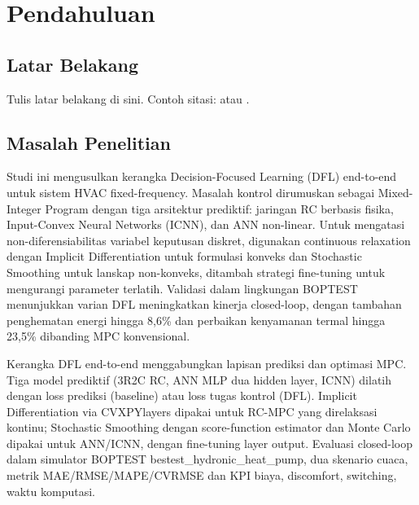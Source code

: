 \chapter{Pendahuluan}
\section{Latar Belakang}
Tulis latar belakang di sini. Contoh sitasi: \textcite{Sheng_2026} atau \parencite{Sheng_2026}.

\section{Masalah Penelitian}
Studi ini mengusulkan kerangka Decision-Focused Learning (DFL) end-to-end untuk sistem HVAC fixed-frequency. 
Masalah kontrol dirumuskan sebagai Mixed-Integer Program dengan tiga arsitektur prediktif: 
jaringan RC berbasis fisika, Input-Convex Neural Networks (ICNN), dan ANN non-linear. 
Untuk mengatasi non-diferensiabilitas variabel keputusan diskret, digunakan continuous relaxation 
dengan Implicit Differentiation untuk formulasi konveks dan Stochastic Smoothing untuk lanskap non-konveks, 
ditambah strategi fine-tuning untuk mengurangi parameter terlatih. Validasi dalam lingkungan BOPTEST 
menunjukkan varian DFL meningkatkan kinerja closed-loop, dengan tambahan penghematan energi hingga 8,6\% 
dan perbaikan kenyamanan termal hingga 23,5\% dibanding MPC konvensional. 

Kerangka DFL end-to-end menggabungkan lapisan prediksi dan optimasi MPC. Tiga model prediktif 
(3R2C RC, ANN MLP dua hidden layer, ICNN) dilatih dengan loss prediksi (baseline) atau loss tugas kontrol 
(DFL). Implicit Differentiation via CVXPYlayers dipakai untuk RC-MPC yang direlaksasi kontinu; Stochastic 
Smoothing dengan score-function estimator dan Monte Carlo dipakai untuk ANN/ICNN, dengan fine-tuning layer 
output. Evaluasi closed-loop dalam simulator BOPTEST bestest\_hydronic\_heat\_pump, dua skenario cuaca, 
metrik MAE/RMSE/MAPE/CVRMSE dan KPI biaya, discomfort, switching, waktu komputasi.
